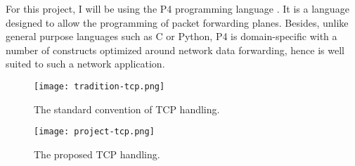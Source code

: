 For this project, I will be using the P4 programming language \cite{p4.org}. It is a language designed to allow the programming of packet forwarding planes. Besides, unlike general purpose languages such as C or Python, P4 is domain-specific with a number of constructs optimized around network data forwarding, hence is well suited to such a network application. 

\vspace*{5mm}

 \begin{figure}[h]
	\centering
	\texttt{[image: tradition-tcp.png]}
	\caption{The standard convention of TCP handling.}
	\label{tradition-tcp}
\end{figure}

\begin{figure}[h]
	\centering
	\texttt{[image: project-tcp.png]}
	\caption{The proposed TCP handling.}
	\label{project-tcp}
\end{figure}